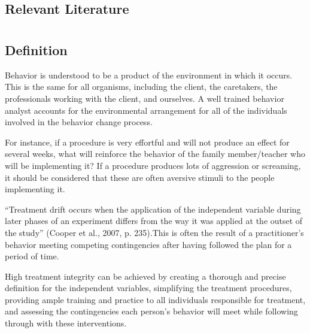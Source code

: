 \subsection{Relevant Literature}
\begin{refsection}
\nocite{test,alang2017police,clayton2018black}
\printbibliography[heading=none]
\end{refsection}
%
%
%
%
%
%
%
\section[\fourkTwo{}]{\fourkTwo{}%
              }
\subsection{Definition}
Behavior is understood to be a product of the environment in which it occurs. This is the same for all organisms, including the client, the caretakers, the professionals working with the client, and ourselves. A well trained behavior analyst accounts for the environmental arrangement for all of the individuals involved in the behavior change process. 

For instance, if a procedure is very effortful and will not produce an effect for several weeks, what will reinforce the behavior of the family member/teacher who will be implementing it? If a procedure produces lots of aggression or screaming, it should be considered that these are often aversive stimuli to the people implementing it.

``Treatment drift occurs when the application of the independent variable during later phases of an experiment differs from the way it was applied at the outset of the study'' (Cooper et al., 2007, p. 235).This is often the result of a practitioner's behavior meeting competing contingencies after having followed the plan for a period of time.

High treatment integrity can be achieved by creating a thorough and precise definition for the independent variables, simplifying the treatment procedures, providing ample training and practice to all individuals responsible for treatment, and assessing the contingencies each person's behavior will meet while following through with these interventions. 

